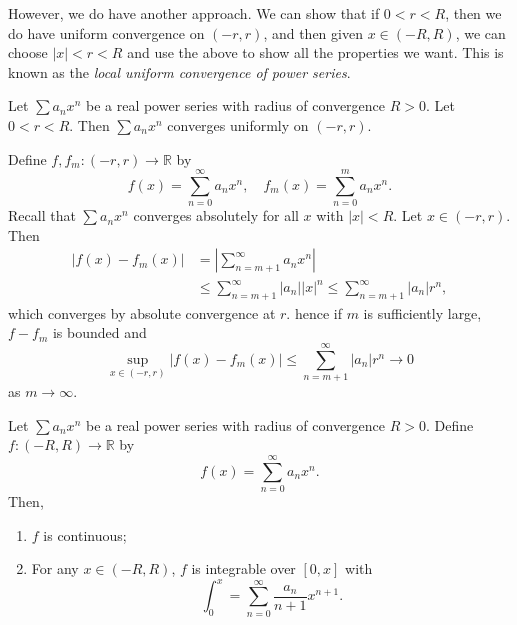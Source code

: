 \documentclass[12pt]{article}
\begin{document}
However, we do have another approach. We can show that if $0 < r < R$, then we do have uniform convergence on $(-r, r)$, and then given $x \in (-R, R)$, we can choose $|x| < r < R$ and use the above to show all the properties we want. This is known as the \textit{local uniform convergence of power series}.

\begin{lemma} 
	Let $\sum a_n x^{n}$ be a real power series with radius of convergence $R > 0$. Let $0 < r < R$. Then $\sum a_n x^{n}$ converges uniformly on $(-r, r)$.
\end{lemma}

\begin{proofbox}
	Define $f, f_m : (-r, r) \to \mathbb{R}$ by
	\[
		f(x) = \sum_{n = 0}^{\infty} a_n x^{n}, \quad f_m(x) = \sum_{n = 0}^{m} a_n x^{n}
	.\]
	Recall that $\sum a_n x^{n}$ converges absolutely for all $x$ with $|x| < R$. Let $x \in (-r, r)$. Then
	\begin{align*}
		|f(x) - f_m(x)| &= \left| \sum_{n = m + 1}^{\infty} a_n x^{n} \right| \\
				&\leq \sum_{n = m+1}^{\infty}|a_n||x|^{n} \leq \sum_{n = m + 1}^{\infty}|a_n|r^{n},
	\end{align*}
	which converges by absolute convergence at $r$. hence if $m$ is sufficiently large, $f - f_m$ is bounded and
	\[
		\sup_{x \in (-r, r)}|f(x) - f_m(x)| \leq \sum_{n = m+1}^{\infty} |a_n|r^{n} \to 0
	\]
	as $m \to \infty$.
\end{proofbox}

\begin{theorem}
	Let $\sum a_n x^{n}$ be a real power series with radius of convergence $R > 0$. Define $f : (-R, R) \to \mathbb{R}$ by
	 \[
		 f(x) = \sum_{n = 0}^{\infty} a_n x^{n}
	.\]
	Then,
	\begin{enumerate}[\normalfont(i)]
		\item $f$ is continuous;
		\item For any $x \in (-R, R)$, $f$ is integrable over $[0, x]$ with
			\[
			\int_{0}^{x} = \sum_{n= 0}^{\infty}\frac{a_n}{n+1}x^{n+1}
			.\]
	\end{enumerate}
\end{theorem}
\end{document}
